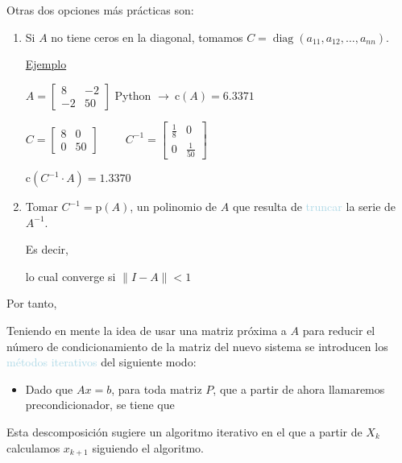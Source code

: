 \documentclass[12pt]{article}
\DeclareMathOperator{\diag}{diag}
\begin{document}
Otras dos opciones más prácticas son:
\begin{enumerate}[label=\arabic*)]
    \item Si $A$ no tiene ceros en la diagonal,  tomamos $C=\diag(a_{11},a_{12},\hdots,a_{nn})$.
    
    \underline{Ejemplo}
    
    $A=\begin{bmatrix}
    	8 & -2\\
    	-2 & 50
	\end{bmatrix}  $\hspace{1cm} Python $\longrightarrow~\mathrm{c}(A)=6.3371$
	
	$C=\begin{bmatrix}
	8 & 0 \\ 
	0 & 50
	\end{bmatrix}\hspace{1cm}C^{-1}=\begin{bmatrix}
	\frac{1}{8} & 0 \\ 
	0 & \frac{1}{50}
	\end{bmatrix} $ 
	
	$\mathrm{c}(C^{-1}\cdot A)=1.3370$
	\item Tomar $C^{-1}=\mathrm{p}(A)$, un polinomio de $A$ que resulta de \textcolor{lightblue}{truncar} la serie de $A^{-1}$.
	
	Es decir, \begin{center}
	\end{center} lo cual converge si $\|I-A\|<1$
\end{enumerate}
Por tanto, \begin{center}
\end{center}
Teniendo en mente la idea de usar una matriz próxima a $A$ para reducir el número de condicionamiento de la matriz del nuevo sistema se introducen los \textcolor{lightblue}{métodos iterativos} del siguiente modo:
\begin{itemize}
\item Dado que $Ax=b$, para toda matriz $P$, que a partir de ahora llamaremos precondicionador, se tiene que \begin{center}
\end{center}
\end{itemize}
Esta descomposición sugiere un algoritmo iterativo en el que a partir de $X_{k}$ calculamos $x_{k+1}$ siguiendo el algoritmo.
\end{document}
